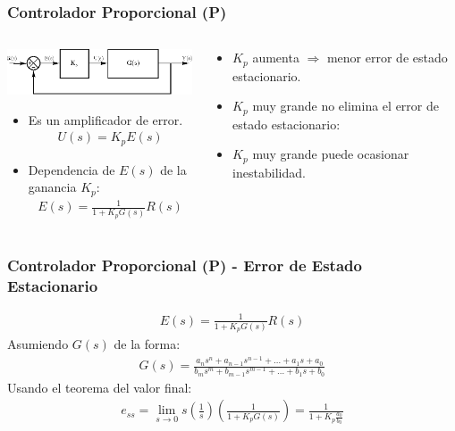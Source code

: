\documentclass[aspectratio=169,handout]{beamer}
\theoremstyle{definition}
\theoremstyle{plain}
\theoremstyle{remark}
\begin{document}
\begin{frame}[<+->]\frametitle{Controlador Proporcional (P)}
\begin{columns}
  \begin{column}{0.5\textwidth}
    \vspace*{5mm}
    \includegraphics[width=7cm]{images/Pcontroller.eps}
    \vspace*{-5mm}
    \begin{itemize}
      \item Es un amplificador de error.
      \begin{align*}
        U(s) = K_p E(s)
      \end{align*}
      \item Dependencia de $E(s)$ de la ganancia $K_p$:
      \begin{align*}
        E(s) = \frac{1}{1+K_p G(s)}R(s)
      \end{align*}
    \end{itemize}
  \end{column} 
  \begin{column}{0.5\textwidth}
    \begin{itemize}
      \item $K_p$ aumenta $\Rightarrow$ menor error de estado estacionario.
      \item $K_p$ muy grande no elimina el error de estado estacionario:
      \item $K_p$ muy grande puede ocasionar inestabilidad.
    \end{itemize}
  \end{column} 
\end{columns}
\end{frame}

\begin{frame}[<+->]\frametitle{Controlador Proporcional (P) - Error de Estado Estacionario}
  \begin{align*}
    E(s) = \frac{1}{1+K_p G(s)}R(s)
  \end{align*}
  \pause
  Asumiendo $G(s)$ de la forma:
  \begin{align*}
    G(s) = \frac{a_n s^n + a_{n-1} s^{n-1} + \dots + a_1 s + a_0}{b_m s^m + b_{m-1} s^{m-1} + \dots + b_1 s + b_0}
  \end{align*}
  \pause
  Usando el teorema del valor final: 
  \begin{align*}
    e_{ss} = \lim_{s \rightarrow 0} s \left(\frac{1}{s}\right) \left(\frac{1}{1 + K_p G(s)}\right) = \frac{1}{1 + K_p \frac{a_0}{b_0}}
  \end{align*}
\end{frame}
\end{document}
